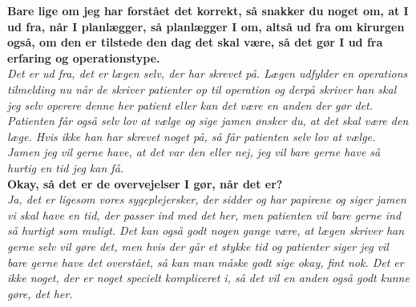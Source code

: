\noindent
\textbf{Bare lige om jeg har forstået det korrekt, så snakker du noget om, at I ud fra, når I planlægger, så planlægger I om, altså ud fra om kirurgen også, om den er tilstede den dag det skal være, så det gør I ud fra erfaring og operationstype.}\\
\noindent
\textit{Det er ud fra, det er lægen selv, der har skrevet på. Lægen udfylder en operations tilmelding nu når de skriver patienter op til operation og derpå skriver han skal jeg selv operere denne her patient eller kan det være en anden der gør det. Patienten får også selv lov at vælge og sige jamen ønsker du, at det skal være den læge. Hvis ikke han har skrevet noget på, så får patienten selv lov at vælge. Jamen jeg vil gerne have, at det var den eller nej, jeg vil bare gerne have så hurtig en tid jeg kan få.} \\
\noindent
\textbf{Okay, så det er de overvejelser I gør, når det er?}\\
\noindent
\textit{Ja, det er ligesom vores sygeplejersker, der sidder og har papirene og siger jamen vi skal have en tid, der passer ind med det her, men patienten vil bare gerne ind så hurtigt som muligt. Det kan også godt nogen gange være, at lægen skriver han gerne selv vil gøre det, men hvis der går et stykke tid og patienter siger jeg vil bare gerne have det overstået, så kan man måske godt sige okay, fint nok. Det er ikke noget, der er noget specielt kompliceret i, så det vil en anden også godt kunne gøre, det her.}
